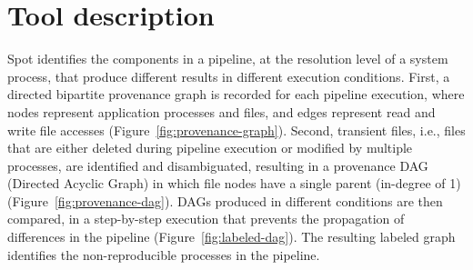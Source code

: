 \documentclass[a4paper,num-refs]{oup-contemporary}
\newcommand{\toolname}[0]{Spot\xspace}
\begin{document}



\section{Tool description}

\toolname identifies the components in a pipeline, at the resolution level of a system process, that produce different
results in different execution conditions. First, a directed
bipartite provenance graph is recorded for each pipeline execution, where nodes
represent application processes and files, and edges represent read and
write file accesses (Figure~\ref{fig:provenance-graph}). Second,
transient files, i.e., files that are either deleted during pipeline
execution or modified by multiple processes, are identified and
disambiguated, resulting in a provenance DAG (Directed Acyclic
Graph) in which file nodes have a single parent (in-degree of 1) (Figure~\ref{fig:provenance-dag}).
DAGs produced in different conditions are then compared, in
a step-by-step execution that prevents the propagation of differences in the pipeline (Figure~\ref{fig:labeled-dag}).
 The resulting labeled graph identifies the
non-reproducible processes in the pipeline.
\end{document}
